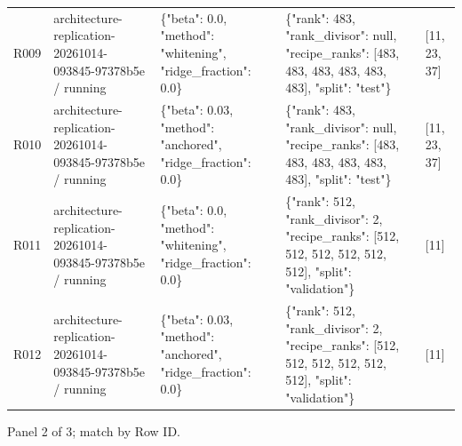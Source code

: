 \documentclass[10pt]{article}
\begin{document}
{\begin{longtable}{p{}p{}p{}p{}p{}}
R009 & architecture-replication-20261014-093845-97378b5e / running & \{"beta": 0.0, "method": "whitening", "ridge\_fraction": 0.0\} & \{"rank": 483, "rank\_divisor": null, "recipe\_ranks": [483, 483, 483, 483, 483, 483], "split": "test"\} & [11, 23, 37] \\
R010 & architecture-replication-20261014-093845-97378b5e / running & \{"beta": 0.03, "method": "anchored", "ridge\_fraction": 0.0\} & \{"rank": 483, "rank\_divisor": null, "recipe\_ranks": [483, 483, 483, 483, 483, 483], "split": "test"\} & [11, 23, 37] \\
R011 & architecture-replication-20261014-093845-97378b5e / running & \{"beta": 0.0, "method": "whitening", "ridge\_fraction": 0.0\} & \{"rank": 512, "rank\_divisor": 2, "recipe\_ranks": [512, 512, 512, 512, 512, 512], "split": "validation"\} & [11] \\
R012 & architecture-replication-20261014-093845-97378b5e / running & \{"beta": 0.03, "method": "anchored", "ridge\_fraction": 0.0\} & \{"rank": 512, "rank\_divisor": 2, "recipe\_ranks": [512, 512, 512, 512, 512, 512], "split": "validation"\} & [11] \\
\end{longtable}}
\par\noindent Panel 2 of 3; match by Row ID.
\end{document}
